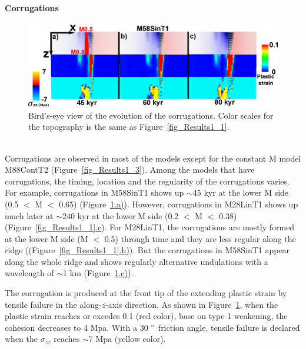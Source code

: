 \paragraph{Corrugations}

\begin{figure}[h]
  \centering
    \includegraphics[width=1.0\textwidth]{./Figures/fig_Results_3_2_6_corrugations_evolution.eps}
  \caption{Bird's-eye view of the evolution of the corrugations. Color scales for the topography is the same as Figure~\hyperref[fig_Results1_1]{\ref{fig_Results1_1}}.}
 \label{fig_Results_3_2_6_corrugations_evolution}
\end{figure}

~\\
Corrugations are observed in most of the models except for the constant M model M88ContT2 (Figure~\hyperref[fig_Results1_3]{\ref{fig_Results1_3}}). Among the models that have corrugations, the timing, location and the regularity of the corrugations varies. For example, corrugations in M58SinT1 shows up $\sim$45 kyr at the lower M side (0.5 $<$ M $<$ 0.65) (Figure~\hyperref[fig_Results_3_2_6_corrugations_evolution]{\ref{fig_Results_3_2_6_corrugations_evolution}.a)}). However, corrugations in M28LinT1 shows up much later at $\sim$240 kyr at the lower M side (0.2 $<$ M $<$ 0.38) (Figure~\hyperref[fig_Results1_1]{\ref{fig_Results1_1}.c}). For M28LinT1, the corrugations are mostly formed at the lower M side (M $<$ 0.5) through time and they are less regular along the ridge ((Figure~\hyperref[fig_Results1_1]{\ref{fig_Results1_1}.h})). But the corrugations in M58SinT1 appear along the whole ridge and shows regularly alternative undulations with a wavelength of $\sim$1 km (Figure~\hyperref[fig_Results_3_2_6_corrugations_evolution]{\ref{fig_Results_3_2_6_corrugations_evolution}.c)}). 

The corrugation is produced at the front tip of the extending plastic strain by tensile failure in the along-$z$-axis direction. As shown in Figure~\hyperref[fig_Results_3_2_6_corrugations_evolution]{\ref{fig_Results_3_2_6_corrugations_evolution}}, when the plastic strain reaches or excedes 0.1 (red color), base on type 1 weakening, the cohesion decreases to 4 Mpa. With a 30 $\degree$ friction angle, tensile failure is declared when the $\sigma_{zz}$ reaches $\sim$7 Mpa (yellow color).

